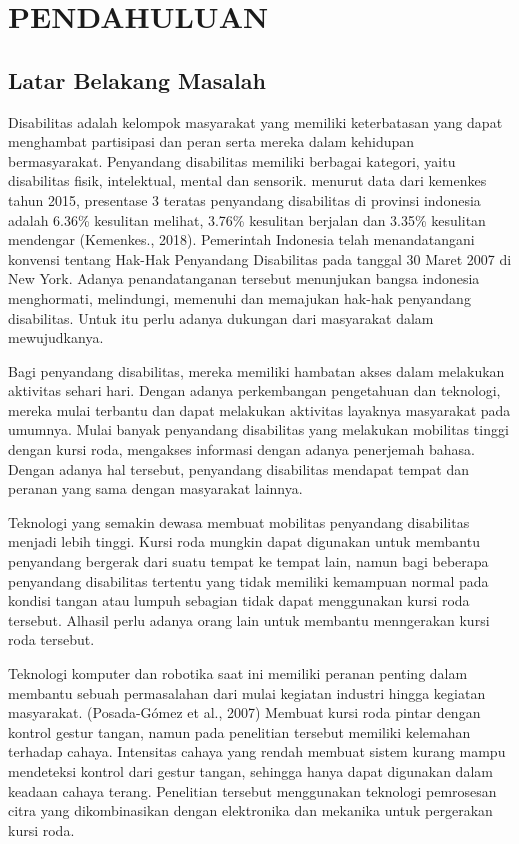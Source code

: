 \chapter{PENDAHULUAN}
\section{Latar Belakang Masalah}
Disabilitas adalah kelompok masyarakat yang memiliki keterbatasan yang dapat menghambat partisipasi dan peran serta mereka dalam kehidupan bermasyarakat. Penyandang disabilitas memiliki berbagai kategori, yaitu disabilitas fisik, intelektual, mental dan sensorik.
menurut data dari kemenkes tahun 2015, presentase 3 teratas penyandang disabilitas di provinsi indonesia adalah 6.36\% kesulitan melihat, 3.76\% kesulitan berjalan dan 3.35\% kesulitan mendengar (Kemenkes., 2018). Pemerintah Indonesia telah menandatangani konvensi tentang Hak-Hak Penyandang Disabilitas pada tanggal 30 Maret 2007 di New York. Adanya penandatanganan tersebut menunjukan bangsa indonesia menghormati, melindungi, memenuhi dan memajukan hak-hak penyandang disabilitas. Untuk itu perlu adanya dukungan dari masyarakat dalam mewujudkanya. 

Bagi penyandang disabilitas, mereka memiliki hambatan akses dalam melakukan aktivitas sehari hari. Dengan adanya perkembangan pengetahuan dan teknologi, mereka mulai terbantu dan dapat melakukan aktivitas layaknya masyarakat pada umumnya.
Mulai banyak penyandang disabilitas yang melakukan mobilitas tinggi dengan kursi roda, mengakses informasi dengan adanya penerjemah bahasa. Dengan adanya hal tersebut, penyandang disabilitas mendapat tempat dan peranan yang sama dengan masyarakat lainnya.

Teknologi yang semakin dewasa membuat mobilitas penyandang disabilitas menjadi lebih tinggi. Kursi roda mungkin dapat digunakan untuk membantu penyandang bergerak dari suatu tempat ke tempat lain, namun bagi beberapa penyandang disabilitas tertentu yang tidak memiliki kemampuan normal pada kondisi tangan atau lumpuh sebagian tidak dapat menggunakan kursi roda tersebut. Alhasil perlu adanya orang lain untuk membantu menngerakan kursi roda tersebut. 

Teknologi komputer dan robotika saat ini memiliki peranan penting dalam membantu sebuah permasalahan dari mulai kegiatan industri hingga kegiatan masyarakat. (Posada-Gómez et al., 2007) Membuat kursi roda pintar dengan kontrol gestur tangan, namun pada penelitian tersebut memiliki kelemahan terhadap cahaya. Intensitas cahaya yang rendah membuat sistem kurang mampu mendeteksi kontrol dari gestur tangan, sehingga hanya dapat digunakan dalam keadaan cahaya terang. Penelitian tersebut menggunakan teknologi pemrosesan citra yang dikombinasikan dengan elektronika dan mekanika untuk pergerakan kursi roda.

